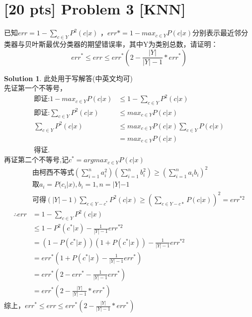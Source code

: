 \documentclass[a4paper,UTF8]{article}
\theoremstyle{definition}
\newtheorem*{solution}{Solution}
\begin{document}
\section*{[20 pts] Problem 3 [KNN]}
已知$err=1-\sum_{c \in Y}P^2(c|x)$
，$err*=1-max_{c \in Y}P(c|x)$分别表示最近邻分类器与贝叶斯最优分类器的期望错误率，其中Y为类别总数，请证明：\begin{equation*}err^* \leq err \leq err^*(2-\frac{|Y|}{|Y|-1}*err^*)\end{equation*}

\begin{solution}
此处用于写解答(中英文均可)\\
先证第一个不等号，
\begin{equation*}
	\begin{split}
		\text{即证:}1-max_{c \in Y}P(c|x) &\le 1-\sum_{c \in Y}P^2(c|x)\\
		\text{即证:}\sum_{c \in Y}P^2(c|x) &\le max_{c \in Y}P(c|x)\\
		\sum_{c \in Y}P^2(c|x) &\le max_{c \in Y}P(c|x)\sum_{c \in Y}P(c|x)\\
		&=max_{c \in Y}P(c|x)\\
		\text{得证.}
	\end{split}
\end{equation*}
再证第二个不等号,记$c^*=argmax_{c \in Y}P(c|x)$
\begin{equation*}
	\begin{split}
		&\text{由柯西不等式}(\sum_{i=1}^na_i^2)(\sum_{i=1}^nb_i^2)\ge(\sum_{i=1}^na_ib_i)^2\\
		&\text{取}a_i=P(c_i|x),b_i=1,n=|Y|-1\\
		&\text{可得}(|Y|-1)\sum_{c\in Y-c^*} P^2(c|x) \ge (\sum_{c\in Y-c*}P(c|x))^2=err^{*2}\\
		\therefore err &= 1-\sum_{c \in Y}P^2(c|x)\\
		&\le 1-P^2(c^*|x)-\frac{1}{|Y|-1}err^{*2}\\
		&=(1-P(c^*|x))(1+P(c^*|x))-\frac{1}{|Y|-1}err^{*2}\\
		&=err^*(1+P(c^*|x)-\frac{1}{|Y|-1}err^*)\\
		&=err^*(2-err^*-\frac{1}{|Y|-1}err^*)\\
		&=err^*(2-\frac{|Y|}{|Y|-1}*err^*)
	\end{split}
\end{equation*}
综上，$err^* \leq err \leq err^*(2-\frac{|Y|}{|Y|-1}*err^*)$
\end{solution}
\newpage
\end{document}
